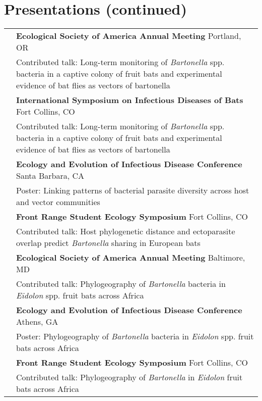 \documentclass[letterpaper]{deedy-resume} %
\begin{document}
\section{Presentations (continued)}
\begin{tabular}{>{\raggedright\arraybackslash}p{2cm}p{16cm}}

2017 & \textbf{Ecological Society of America Annual Meeting} Portland, OR\\
	& Contributed talk: Long-term monitoring of \textit{Bartonella} spp. bacteria in a captive colony of fruit bats and experimental evidence of bat flies as vectors of bartonella\\

2017 & \textbf{International Symposium on Infectious Diseases of Bats} Fort Collins, CO\\
	& Contributed talk: Long-term monitoring of \textit{Bartonella} spp. bacteria in a captive colony of fruit bats and experimental evidence of bat flies as vectors of bartonella\\
	
2017 & \textbf{Ecology and Evolution of Infectious Disease Conference} Santa Barbara, CA\\
	& Poster: Linking patterns of bacterial parasite diversity across host and vector communities\\

2017 & \textbf{Front Range Student Ecology Symposium} Fort Collins, CO\\
	& Contributed talk: Host phylogenetic distance and ectoparasite overlap predict \textit{Bartonella} sharing in European bats\\

2015 & \textbf{Ecological Society of America Annual Meeting} Baltimore, MD\\
	& Contributed talk: Phylogeography of \textit{Bartonella} bacteria in \textit{Eidolon} spp. fruit bats across Africa\\
	
2015 & \textbf{Ecology and Evolution of Infectious Disease Conference} Athens, GA\\
	& Poster: Phylogeography of \textit{Bartonella} bacteria in \textit{Eidolon} spp. fruit bats across Africa\\
	
2015 & \textbf{Front Range Student Ecology Symposium} Fort Collins, CO\\
	& Contributed talk: Phylogeography of \textit{Bartonella} in \textit{Eidolon} fruit bats across Africa\\


\end{tabular}
\end{document}
